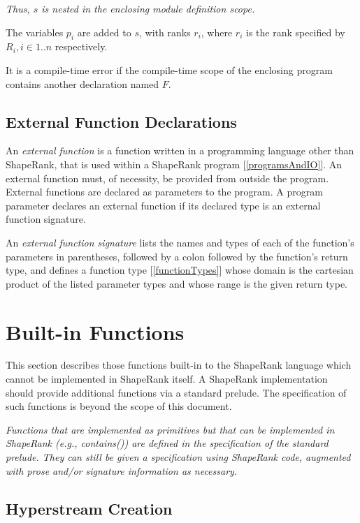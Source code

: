 \documentclass{article}
\begin{document}
{\em Thus, $s$ is nested in the enclosing module definition scope.}

The variables $p_i$ are added to $s$, with ranks $r_i$, where $r_i$ is the rank specified by $R_i, i \in 1..n$ respectively.

It is a compile-time error if the compile-time scope of the enclosing program contains another declaration named $F$.

\subsection{External Function Declarations}
\label{externalFunctionDeclarations}

An {\em external function} is a function written in a programming language other than ShapeRank, that is used within a ShapeRank program [\ref{programsAndIO}].
An external function must, of necessity, be provided from outside the program. External functions are declared as parameters to the program.  A program parameter declares an external function if its declared type is an external function signature.  

\ExternalFunctionSignature{}

An {\em external function signature} lists the names and types of each of the function's parameters in parentheses, followed by a colon followed by the function's return type, and defines a  function type [\ref{functionTypes}] whose domain is the cartesian product of the listed parameter types and whose range is the given return type.


\section{Built-in Functions}
\label{builtinFunctions}

This section describes those functions built-in to the ShapeRank language which cannot be implemented in ShapeRank itself. A ShapeRank implementation should provide additional functions via a standard prelude. The specification of such functions is beyond the scope of this document. 

{\em
Functions that are implemented as primitives but that can be implemented in
ShapeRank (e.g., contains()) are defined in the specification of the standard prelude. They can still be given a specification using ShapeRank code, augmented with prose
and/or signature information as necessary.
}

\subsection{Hyperstream Creation}
\label{streamCreation}
\end{document}
